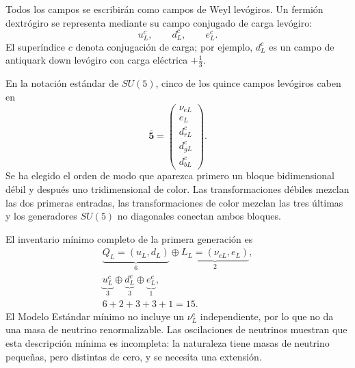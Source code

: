 Todos los campos se escribirán como campos de Weyl levógiros. Un fermión dextrógiro se representa mediante su campo conjugado de carga levógiro:
\begin{equation}
u^c_L,\qquad d^c_L,\qquad e^c_L.
\label{eq:l10-left-handed-bookkeeping}
\end{equation}
El superíndice \(c\) denota conjugación de carga; por ejemplo, \(d^c_L\) es un campo de antiquark down levógiro con carga eléctrica \(+\tfrac13\).

En la notación estándar de \(SU(5)\), cinco de los quince campos levógiros caben en
\begin{equation}
\overline{\mathbf5}
=
\begin{pmatrix}
\nu_{eL}\\
e_L\\
d^c_{rL}\\
d^c_{gL}\\
d^c_{bL}
\end{pmatrix}.
\label{eq:l10-fivebar}
\end{equation}
Se ha elegido el orden de modo que aparezca primero un bloque bidimensional débil y después uno tridimensional de color. Las transformaciones débiles mezclan las dos primeras entradas, las transformaciones de color mezclan las tres últimas y los generadores \(SU(5)\) no diagonales conectan ambos bloques.


El inventario mínimo completo de la primera generación es
\begin{equation}
\begin{gathered}
\underbrace{Q_L=(u_L,d_L)}_{6}
\oplus
\underbrace{L_L=(\nu_{eL},e_L)}_{2},\\
\underbrace{u^c_L}_{3}
\oplus
\underbrace{d^c_L}_{3}
\oplus
\underbrace{e^c_L}_{1},\\
6+2+3+3+1=15.
\end{gathered}
\label{eq:l10-fifteen}
\end{equation}
El Modelo Estándar mínimo no incluye un \(\nu^c_L\) independiente, por lo que no da una masa de neutrino renormalizable. Las oscilaciones de neutrinos muestran que esta descripción mínima es incompleta: la naturaleza tiene masas de neutrino pequeñas, pero distintas de cero, y se necesita una extensión.

